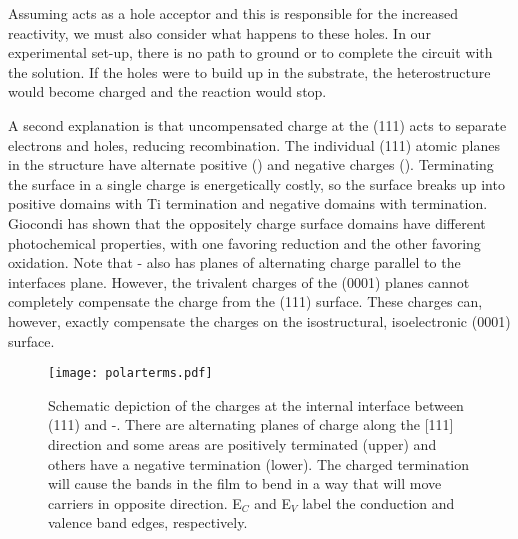 Assuming  acts as a hole acceptor and this is responsible for the increased
reactivity, we must also consider what happens to these holes.  In our experimental
set-up, there is no path to ground or to complete the circuit with the solution.  If the
holes were to build up in the substrate, the heterostructure would become charged and the
reaction would stop.

A second explanation is that uncompensated charge at the (111) acts to separate
electrons and holes, reducing recombination.  The individual (111) atomic planes in the
 structure have alternate positive () and negative charges
().  Terminating the surface in a single charge is energetically costly, so
the surface breaks up into positive domains with Ti termination and negative domains with
 termination.  Giocondi\cite{Giocondi:2003wc} has shown that the oppositely
charge surface domains have different photochemical properties, with one favoring
reduction and the other favoring oxidation.  Note that \textalpha- also has
planes of alternating charge parallel to the interfaces plane.  However, the trivalent
charges of the (0001) planes cannot completely compensate the charge from the
(111) surface.  These charges can, however, exactly compensate the charges on
the isostructural, isoelectronic (0001) surface.
\begin{figure}
\begin{center}
\texttt{[image: polarterms.pdf]}
\caption[Charges at internal interface between  and ]{%
		Schematic depiction of the charges at the internal interface 
		between (111) and \textalpha-. There are 
		alternating planes of charge along the [111] direction and some 
		areas are positively terminated (upper) and others have a negative 
		termination (lower). The charged termination will cause the bands 
		in the film to bend in a way that will move carriers in opposite 
		direction. E$_C$ and E$_V$ label the conduction and valence band 
		edges, respectively.}
\label{fig:polarterms}
\end{center}
\end{figure}
